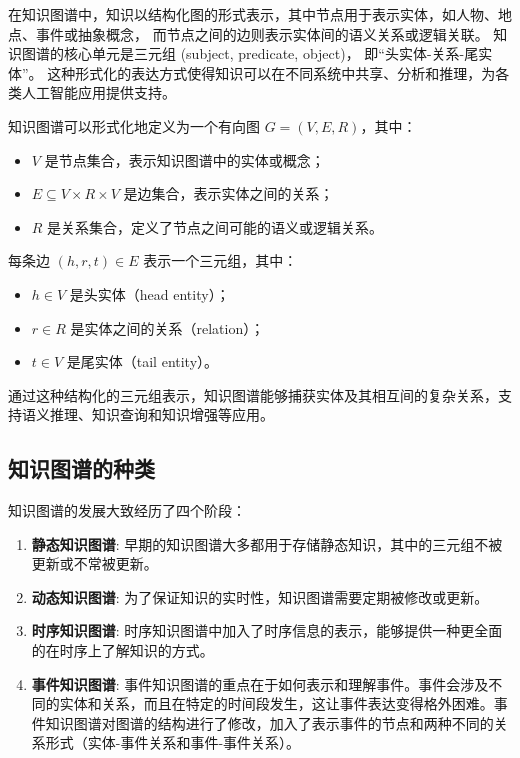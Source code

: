 在知识图谱中，知识以结构化图的形式表示，其中节点用于表示实体，如人物、地点、事件或抽象概念，
而节点之间的边则表示实体间的语义关系或逻辑关联。
知识图谱的核心单元是三元组 (subject, predicate, object)，
即“头实体-关系-尾实体”。
这种形式化的表达方式使得知识可以在不同系统中共享、分析和推理，为各类人工智能应用提供支持。

\vspace{0.5em}

知识图谱可以形式化地定义为一个有向图 $G = (V, E, R)$，其中：
\begin{itemize}
    \item $V$ 是节点集合，表示知识图谱中的实体或概念；
    \item $E \subseteq V \times R \times V$ 是边集合，表示实体之间的关系；
    \item $R$ 是关系集合，定义了节点之间可能的语义或逻辑关系。
\end{itemize}

每条边 $(h, r, t) \in E$ 表示一个三元组，其中：
\begin{itemize}
    \item $h \in V$ 是头实体（head entity）；
    \item $r \in R$ 是实体之间的关系（relation）；
    \item $t \in V$ 是尾实体（tail entity）。
\end{itemize}

通过这种结构化的三元组表示，知识图谱能够捕获实体及其相互间的复杂关系，支持语义推理、知识查询和知识增强等应用。

\subsection{知识图谱的种类}
知识图谱的发展大致经历了四个阶段\cite{Jiang2023}：

\begin{enumerate}
  \item \textbf{静态知识图谱}: 早期的知识图谱大多都用于存储静态知识，其中的三元组不被更新或不常被更新。
  \item \textbf{动态知识图谱}: 为了保证知识的实时性，知识图谱需要定期被修改或更新。
  \item \textbf{时序知识图谱}: 时序知识图谱中加入了时序信息的表示，能够提供一种更全面的在时序上了解知识的方式。
  \item \textbf{事件知识图谱}: 事件知识图谱的重点在于如何表示和理解事件。事件会涉及不同的实体和关系，而且在特定的时间段发生，这让事件表达变得格外困难。事件知识图谱对图谱的结构进行了修改，加入了表示事件的节点和两种不同的关系形式（实体-事件关系和事件-事件关系）。
\end{enumerate}

